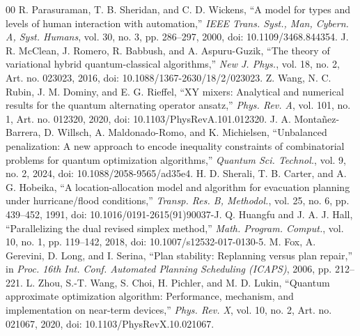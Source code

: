 \documentclass[conference]{IEEEtran}
\begin{document}
\begin{thebibliography}{00}
 R. Parasuraman, T. B. Sheridan, and C. D. Wickens, ``A model for types and levels of human interaction with automation,'' \textit{IEEE Trans. Syst., Man, Cybern. A, Syst. Humans}, vol. 30, no. 3, pp. 286--297, 2000, doi: 10.1109/3468.844354.
 J. R. McClean, J. Romero, R. Babbush, and A. Aspuru-Guzik, ``The theory of variational hybrid quantum-classical algorithms,'' \textit{New J. Phys.}, vol. 18, no. 2, Art. no. 023023, 2016, doi: 10.1088/1367-2630/18/2/023023.
 Z. Wang, N. C. Rubin, J. M. Dominy, and E. G. Rieffel, ``XY mixers: Analytical and numerical results for the quantum alternating operator ansatz,'' \textit{Phys. Rev. A}, vol. 101, no. 1, Art. no. 012320, 2020, doi: 10.1103/PhysRevA.101.012320.
 J. A. Monta\~{n}ez-Barrera, D. Willsch, A. Maldonado-Romo, and K. Michielsen, ``Unbalanced penalization: A new approach to encode inequality constraints of combinatorial problems for quantum optimization algorithms,'' \textit{Quantum Sci. Technol.}, vol. 9, no. 2, 2024, doi: 10.1088/2058-9565/ad35e4.
 H. D. Sherali, T. B. Carter, and A. G. Hobeika, ``A location-allocation model and algorithm for evacuation planning under hurricane/flood conditions,'' \textit{Transp. Res. B, Methodol.}, vol. 25, no. 6, pp. 439--452, 1991, doi: 10.1016/0191-2615(91)90037-J.
 Q. Huangfu and J. A. J. Hall, ``Parallelizing the dual revised simplex method,'' \textit{Math. Program. Comput.}, vol. 10, no. 1, pp. 119--142, 2018, doi: 10.1007/s12532-017-0130-5.
 M. Fox, A. Gerevini, D. Long, and I. Serina, ``Plan stability: Replanning versus plan repair,'' in \textit{Proc. 16th Int. Conf. Automated Planning Scheduling (ICAPS)}, 2006, pp. 212--221.
 L. Zhou, S.-T. Wang, S. Choi, H. Pichler, and M. D. Lukin, ``Quantum approximate optimization algorithm: Performance, mechanism, and implementation on near-term devices,'' \textit{Phys. Rev. X}, vol. 10, no. 2, Art. no. 021067, 2020, doi: 10.1103/PhysRevX.10.021067.
\end{thebibliography}
\end{document}
